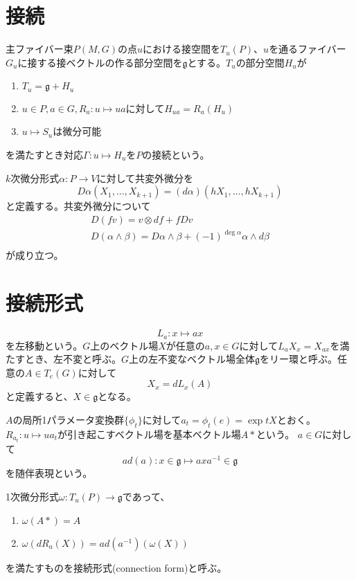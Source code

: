 
\section{接続}
	\begin{dfn}[接続]
		主ファイバー束$P(M, G)$の点$u$における接空間を$T_u(P)$、$u$を通るファイバー$G_u$に接する接ベクトルの作る部分空間を$\mathfrak{g}$とする。$T_u$の部分空間$H_u$が
		\begin{enumerate}
			\item $T_u = \mathfrak{g} + H_u$
			\item $u \in P, a \in G, R_a: u \mapsto ua$に対して$H_{ua} = R_a(H_u)$
			\item $u \mapsto S_u$は微分可能
		\end{enumerate}
		を満たすとき対応$\Gamma: u \mapsto H_u$を$P$の接続という。
	\end{dfn}

	$k$次微分形式$\alpha: P \rightarrow V$に対して共変外微分を
		\[D\alpha(X_1, \ldots, X_{k+1}) = (d\alpha)(hX_1, \ldots, hX_{k+1})\]
	と定義する。共変外微分について
	\begin{gather*}
		D(fv) = v \otimes df + fDv\\
		D(\alpha \wedge \beta) = D\alpha \wedge \beta + (-1)^{\deg\alpha}\alpha \wedge d\beta\\
	\end{gather*}
	が成り立つ。

\section{接続形式}
		\[L_a: x \mapsto ax\]
	を左移動という。$G$上のベクトル場$X$が任意の$a, x \in G$に対して$L_aX_x = X_{ax}$を満たすとき、左不変と呼ぶ。$G$上の左不変なベクトル場全体$\mathfrak{g}$をリー環と呼ぶ。任意の$A \in T_e(G)$に対して
		\[X_x = dL_x(A)\]
	と定義すると、$X \in \mathfrak{g}$となる。

	$A$の局所1パラメータ変換群$\{\phi_t\}$に対して$a_t = \phi_t(e) = \exp tX$とおく。$R_{a_t}: u \mapsto ua_t$が引き起こすベクトル場を基本ベクトル場$A*$という。
	$a \in G$に対して
		\[ad(a): x \in \mathfrak{g} \mapsto axa^{-1} \in \mathfrak{g}\]
	を随伴表現という。
	\begin{dfn}[接続形式]
		1次微分形式$\omega: T_u(P) \rightarrow \mathfrak{g}$であって、
		\begin{enumerate}
			\item $\omega(A*) = A$
			\item $\omega(dR_a(X)) = ad(a^{-1})(\omega(X))$
		\end{enumerate}
		を満たすものを接続形式(connection form)と呼ぶ。
	\end{dfn}

